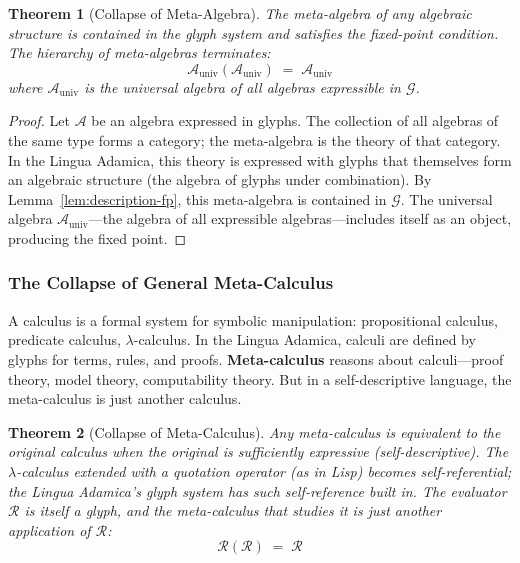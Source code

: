 \documentclass[12pt, letterpaper]{book}
\newtheorem{theorem}{Theorem}[chapter]
\begin{document}
\begin{theorem}[Collapse of Meta-Algebra]\label{thm:meta-algebra}
The meta-algebra of any algebraic structure is contained in the glyph system and satisfies the fixed-point condition. The hierarchy of meta-algebras terminates:
\[
\mathcal{A}_{\mathrm{univ}}(\mathcal{A}_{\mathrm{univ}}) \;=\; \mathcal{A}_{\mathrm{univ}}
\]
where $\mathcal{A}_{\mathrm{univ}}$ is the universal algebra of all algebras expressible in $\mathcal{G}$.
\end{theorem}

\begin{proof}
Let $\mathcal{A}$ be an algebra expressed in glyphs. The collection of all algebras of the same type forms a category; the meta-algebra is the theory of that category. In the Lingua Adamica, this theory is expressed with glyphs that themselves form an algebraic structure (the algebra of glyphs under combination). By Lemma~\ref{lem:description-fp}, this meta-algebra is contained in $\mathcal{G}$. The universal algebra $\mathcal{A}_{\mathrm{univ}}$---the algebra of all expressible algebras---includes itself as an object, producing the fixed point.
\end{proof}

\subsubsection{The Collapse of General Meta-Calculus}

A calculus is a formal system for symbolic manipulation: propositional calculus, predicate calculus, $\lambda$-calculus. In the Lingua Adamica, calculi are defined by glyphs for terms, rules, and proofs. \textbf{Meta-calculus} reasons about calculi---proof theory, model theory, computability theory. But in a self-descriptive language, the meta-calculus is just another calculus.

\begin{theorem}[Collapse of Meta-Calculus]\label{thm:meta-calculus}
Any meta-calculus is equivalent to the original calculus when the original is sufficiently expressive (self-descriptive). The $\lambda$-calculus extended with a quotation operator (as in Lisp) becomes self-referential; the Lingua Adamica's glyph system has such self-reference built in. The evaluator $\mathcal{R}$ is itself a glyph, and the meta-calculus that studies it is just another application of $\mathcal{R}$:
\[
\mathcal{R}(\mathcal{R}) \;=\; \mathcal{R}
\]
\end{theorem}
\end{document}
